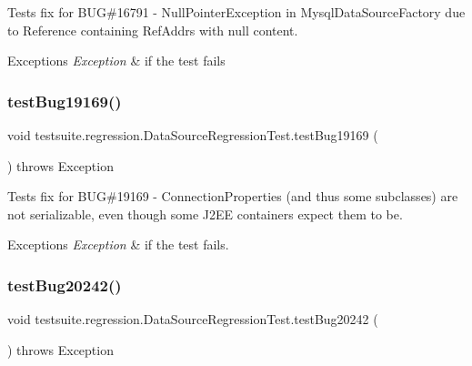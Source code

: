 Tests fix for B\+UG\#16791 -\/ Null\+Pointer\+Exception in Mysql\+Data\+Source\+Factory due to Reference containing Ref\+Addrs with null content.


\begin{DoxyExceptions}{Exceptions}
{\em Exception} & if the test fails \\
\hline
\end{DoxyExceptions}
\mbox{\label{classtestsuite_1_1regression_1_1_data_source_regression_test_a9ef6137b8f62a30be45c74a81be1d299}} 
\subsubsection{\texorpdfstring{test\+Bug19169()}{testBug19169()}}
{\footnotesize\ttfamily void testsuite.\+regression.\+Data\+Source\+Regression\+Test.\+test\+Bug19169 (\begin{DoxyParamCaption}{ }\end{DoxyParamCaption}) throws Exception}

Tests fix for B\+UG\#19169 -\/ Connection\+Properties (and thus some subclasses) are not serializable, even though some J2\+EE containers expect them to be.


\begin{DoxyExceptions}{Exceptions}
{\em Exception} & if the test fails. \\
\hline
\end{DoxyExceptions}
\mbox{\label{classtestsuite_1_1regression_1_1_data_source_regression_test_a59191cb9aeb387f68d1d484356d9c744}} 
\subsubsection{\texorpdfstring{test\+Bug20242()}{testBug20242()}}
{\footnotesize\ttfamily void testsuite.\+regression.\+Data\+Source\+Regression\+Test.\+test\+Bug20242 (\begin{DoxyParamCaption}{ }\end{DoxyParamCaption}) throws Exception}

